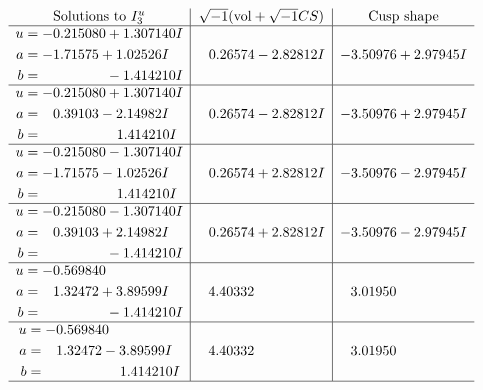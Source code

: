 \documentclass[1p]{elsarticle_modified}
\theoremstyle{definition}
\newcommand{\I}{\sqrt{-1}}
\begin{document}
$$\begin{array}{c|c|c}  
\text{Solutions to }I^u_{3}& \I (\text{vol} + \sqrt{-1}CS) & \text{Cusp shape}\\
 \hline 
\begin{aligned}
u &= -0.215080 + 1.307140 I \\
a &= -1.71575 + 1.02526 I \\
b &= \phantom{-0.000000 } -1.414210 I\end{aligned}
 & \phantom{-}0.26574 - 2.82812 I & -3.50976 + 2.97945 I \\ \hline\begin{aligned}
u &= -0.215080 + 1.307140 I \\
a &= \phantom{-}0.39103 - 2.14982 I \\
b &= \phantom{-0.000000 -}1.414210 I\end{aligned}
 & \phantom{-}0.26574 - 2.82812 I & -3.50976 + 2.97945 I \\ \hline\begin{aligned}
u &= -0.215080 - 1.307140 I \\
a &= -1.71575 - 1.02526 I \\
b &= \phantom{-0.000000 -}1.414210 I\end{aligned}
 & \phantom{-}0.26574 + 2.82812 I & -3.50976 - 2.97945 I \\ \hline\begin{aligned}
u &= -0.215080 - 1.307140 I \\
a &= \phantom{-}0.39103 + 2.14982 I \\
b &= \phantom{-0.000000 } -1.414210 I\end{aligned}
 & \phantom{-}0.26574 + 2.82812 I & -3.50976 - 2.97945 I \\ \hline\begin{aligned}
u &= -0.569840\phantom{ +0.000000I} \\
a &= \phantom{-}1.32472 + 3.89599 I \\
b &= \phantom{-0.000000 } -1.414210 I\end{aligned}
 & \phantom{-}4.40332\phantom{ +0.000000I} & \phantom{-}3.01950\phantom{ +0.000000I} \\ \hline\begin{aligned}
u &= -0.569840\phantom{ +0.000000I} \\
a &= \phantom{-}1.32472 - 3.89599 I \\
b &= \phantom{-0.000000 -}1.414210 I\end{aligned}
 & \phantom{-}4.40332\phantom{ +0.000000I} & \phantom{-}3.01950\phantom{ +0.000000I}\\
 \hline 
 \end{array}$$\newpage
\end{document}
